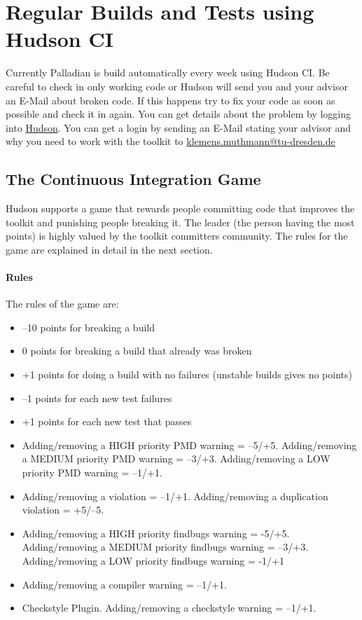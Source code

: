 \documentclass[a4paper,twoside]{book}      %
\begin{document}
\section{Regular Builds and Tests using Hudson CI}
Currently Palladian is build automatically every week using Hudson CI. Be careful to check in only working code or Hudson will send you and your advisor an E-Mail about broken code. If this happens try to fix your code as soon as possible and check it in again. You can get details about the problem by logging into \href{http://www.effingo.de/hudson}{Hudson}. You can get a login by sending an E-Mail stating your advisor and why you need to work with the toolkit to \href{mailto:klemens.muthmann@tu-dresden.de}{klemens.muthmann@tu-dresden.de}
\subsection{The Continuous Integration Game}
\label{sec:cigame}
Hudson supports a game that rewards people committing code that improves the toolkit and punishing people breaking it. The leader (the person having the most points) is highly valued by the toolkit committers community. The rules for the game are explained in detail in the next section.
\paragraph{Rules}
The rules of the game are:
\begin{itemize}
\item --10 points for breaking a build
\item 0 points for breaking a build that already was broken
\item +1 points for doing a build with no failures (unstable builds gives no points)
\item --1 points for each new test failures
\item +1 points for each new test that passes
\item Adding/removing a HIGH priority PMD warning = --5/+5. Adding/removing a MEDIUM priority PMD warning = --3/+3. Adding/removing a LOW priority PMD warning = --1/+1.
\item Adding/removing a violation = --1/+1. Adding/removing a duplication violation = +5/--5.
\item Adding/removing a HIGH priority findbugs warning = -5/+5. Adding/removing a MEDIUM priority findbugs warning = --3/+3. Adding/removing a LOW priority findbugs warning = -1/+1
\item Adding/removing a compiler warning = --1/+1.
\item Checkstyle Plugin. Adding/removing a checkstyle warning = --1/+1.
\end{itemize}
\end{document}
